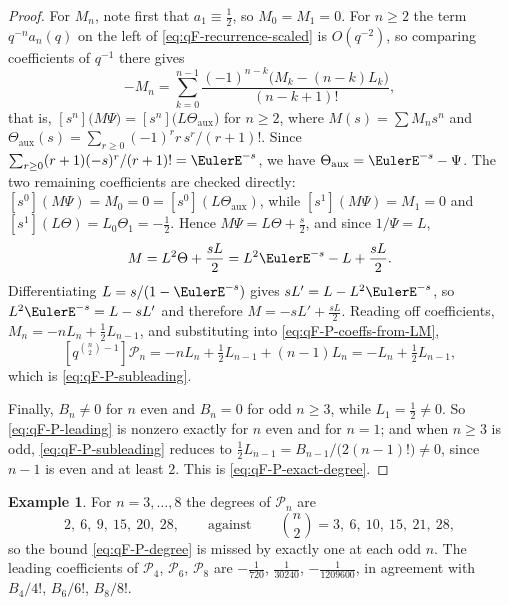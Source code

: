 \documentclass[11pt,a4paper,oneside,openany]{book}
\theoremstyle{definition}
\newtheorem{example}[example]{Example}
\theoremstyle{remark}
\begin{document}
\begin{proof}
For $M_n$, note first that $a_1\equiv\tfrac12$, so $M_0=M_1=0$.  For $n\ge2$ the
term $q^{-n}a_n(q)$ on the left of \eqref{eq:qF-recurrence-scaled} is
$O(q^{-2})$, so comparing coefficients of $q^{-1}$ there gives
\[
 -M_n=\sum_{k=0}^{n-1}\frac{(-1)^{n-k}\bigl(M_k-(n-k)L_k\bigr)}{(n-k+1)!},
\]
that is, $[s^n]\bigl(M\Psi\bigr)=[s^n]\bigl(L\Theta_{\mathrm{aux}}\bigr)$ for $n\ge2$, where
$M(s)=\sum M_ns^n$ and
$\Theta_{\mathrm{aux}}(s)=\sum_{r\ge0}(-1)^rr\,s^r/(r+1)!$.  Since
$\sum_{r\ge0}(r+1)(-s)^r/(r+1)!=\EulerE^{-s}$, we have
$\Theta_{\mathrm{aux}}=\EulerE^{-s}-\Psi$.  The two
remaining coefficients are checked directly:
$[s^0](M\Psi)=M_0=0=[s^0](L\Theta_{\mathrm{aux}})$, while $[s^1](M\Psi)=M_1=0$ and
$[s^1](L\Theta)=L_0\Theta_1=-\tfrac12$.  Hence $M\Psi=L\Theta+\tfrac s2$, and
since $1/\Psi=L$,
\[
 M=L^2\Theta+\frac{sL}2=L^2\EulerE^{-s}-L+\frac{sL}2 .
\]
Differentiating $L=s/(1-\EulerE^{-s})$ gives $sL'=L-L^2\EulerE^{-s}$, so
$L^2\EulerE^{-s}=L-sL'$ and therefore $M=-sL'+\tfrac{sL}2$.  Reading off
coefficients, $M_n=-nL_n+\tfrac12L_{n-1}$, and substituting into
\eqref{eq:qF-P-coeffs-from-LM},
\[
 [q^{\binom n2-1}]\mathcal P_n=-nL_n+\tfrac12L_{n-1}+(n-1)L_n
 =-L_n+\tfrac12L_{n-1},
\]
which is \eqref{eq:qF-P-subleading}.

Finally, $B_n\ne0$ for $n$ even and $B_n=0$ for odd $n\ge3$, while
$L_1=\tfrac12\ne0$.  So \eqref{eq:qF-P-leading} is nonzero exactly for $n$ even
and for $n=1$; and when $n\ge3$ is odd, \eqref{eq:qF-P-subleading} reduces to
$\tfrac12L_{n-1}=B_{n-1}/\bigl(2(n-1)!\bigr)\ne0$, since $n-1$ is even and at
least $2$.  This is \eqref{eq:qF-P-exact-degree}.
\end{proof}

\begin{example}\label{ex:qF-P-degrees}
For $n=3,\ldots,8$ the degrees of $\mathcal P_n$ are
\[
 2,\ 6,\ 9,\ 15,\ 20,\ 28,
 \qquad\text{against}\qquad
 \binom n2=3,\ 6,\ 10,\ 15,\ 21,\ 28 ,
\]
so the bound \eqref{eq:qF-P-degree} is missed by exactly one at each odd $n$.
The leading coefficients of $\mathcal P_4$, $\mathcal P_6$, $\mathcal P_8$ are
$-\tfrac1{720}$, $\tfrac1{30240}$, $-\tfrac1{1209600}$, in agreement with
$B_4/4!$, $B_6/6!$, $B_8/8!$.
\end{example}


\end{document}
